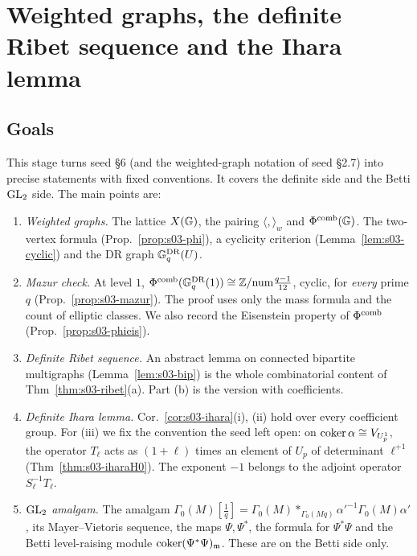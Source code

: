 \section{Weighted graphs, the definite Ribet sequence and the Ihara lemma}\label{sec:stage-03}
\providecommand{\BG}{\mathrm{BG}}          %

\subsection{Goals}
This stage turns seed \S6 (and the weighted-graph notation of seed \S2.7) into precise statements with fixed conventions.
It covers the definite side and the Betti $\mathrm{GL}_2$ side. The main points are:
\begin{enumerate}[label=(G\arabic*)]
\item \emph{Weighted graphs.} The lattice $X(\mathbb{G})$, the pairing $\langle,\rangle_w$ and $\Phi^{\mathrm{comb}}(\mathbb{G})$. The two-vertex formula
  (Prop.~\ref{prop:s03-phi}), a cyclicity criterion (Lemma~\ref{lem:s03-cyclic}) and the DR graph $\mathbb{G}^{\mathrm{DR}}_q(U)$.
\item \emph{Mazur check.} At level $1$, $\Phi^{\mathrm{comb}}(\mathbb{G}^{\mathrm{DR}}_q(1))\cong\mathbb{Z}/\mathrm{num}\frac{q-1}{12}$, cyclic, for \emph{every} prime $q$
  (Prop.~\ref{prop:s03-mazur}). The proof uses only the mass formula and the count of elliptic classes. We also record the
  Eisenstein property of $\Phi^{\mathrm{comb}}$ (Prop.~\ref{prop:s03-phieis}).
\item \emph{Definite Ribet sequence.} An abstract lemma on connected bipartite multigraphs (Lemma~\ref{lem:s03-bip}) is the
  whole combinatorial content of Thm~\ref{thm:s03-ribet}(a). Part (b) is the version with coefficients.
\item \emph{Definite Ihara lemma.} Cor.~\ref{cor:s03-ihara}(i), (ii) hold over every coefficient group. For (iii) we fix the
  convention the seed left open: on $\operatorname{coker}\alpha\cong V_{U^1_p}$, the operator $T_\ell$ acts as $(1+\ell)$ times an element of
  $U_p$ of determinant $\ell^{+1}$ (Thm~\ref{thm:s03-iharaH0}). The exponent $-1$ belongs to the adjoint operator
  $S_\ell^{-1}T_\ell$.
\item \emph{$\mathrm{GL}_2$ amalgam.} The amalgam $\Gamma_0(M)[\frac1q]=\Gamma_0(M)*_{\Gamma_0(Mq)}\alpha'^{-1}\Gamma_0(M)\alpha'$, its
  Mayer--Vietoris sequence, the maps $\Psi,\Psi^*$, the formula for $\Psi^*\Psi$ and the Betti level-raising module
  $\operatorname{coker}(\Psi^*\Psi)_{\mathfrak{m}}$. These are on the Betti side only.
\end{enumerate}

